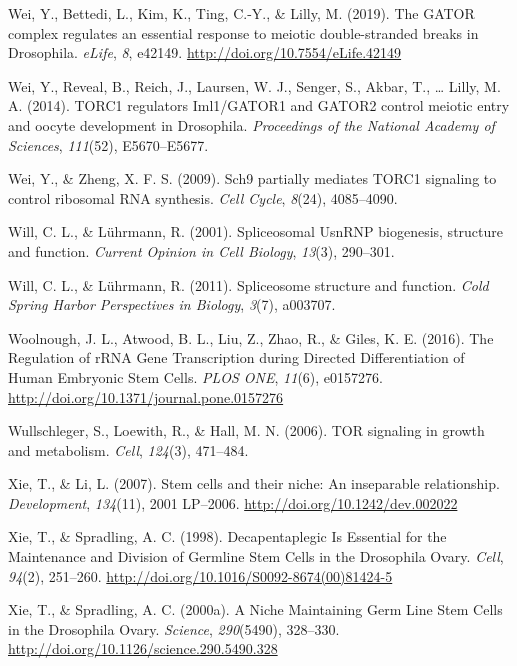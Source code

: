 \documentclass[12pt,twoside]{reedthesis}
\newlength{\cslhangindent}
\newenvironment{cslreferences}%
  {\setlength{\parindent}{0pt}%
  \everypar{\setlength{\hangindent}{\cslhangindent}}\ignorespaces}%
  {\par}
\begin{document}
\begin{cslreferences}
\leavevmode\hypertarget{ref-Wei2018a}{}%
Wei, Y., Bettedi, L., Kim, K., Ting, C.-Y., \& Lilly, M. (2019). The GATOR complex regulates an essential response to meiotic double-stranded breaks in Drosophila. \emph{eLife}, \emph{8}, e42149. \url{http://doi.org/10.7554/eLife.42149}

\leavevmode\hypertarget{ref-Wei2014b}{}%
Wei, Y., Reveal, B., Reich, J., Laursen, W. J., Senger, S., Akbar, T., \ldots{} Lilly, M. A. (2014). TORC1 regulators Iml1/GATOR1 and GATOR2 control meiotic entry and oocyte development in Drosophila. \emph{Proceedings of the National Academy of Sciences}, \emph{111}(52), E5670--E5677.

\leavevmode\hypertarget{ref-Wei2009a}{}%
Wei, Y., \& Zheng, X. F. S. (2009). Sch9 partially mediates TORC1 signaling to control ribosomal RNA synthesis. \emph{Cell Cycle}, \emph{8}(24), 4085--4090.

\leavevmode\hypertarget{ref-Will2001}{}%
Will, C. L., \& Lührmann, R. (2001). Spliceosomal UsnRNP biogenesis, structure and function. \emph{Current Opinion in Cell Biology}, \emph{13}(3), 290--301.

\leavevmode\hypertarget{ref-Will2011d}{}%
Will, C. L., \& Lührmann, R. (2011). Spliceosome structure and function. \emph{Cold Spring Harbor Perspectives in Biology}, \emph{3}(7), a003707.

\leavevmode\hypertarget{ref-woolnoughRegulationRRNAGene2016}{}%
Woolnough, J. L., Atwood, B. L., Liu, Z., Zhao, R., \& Giles, K. E. (2016). The Regulation of rRNA Gene Transcription during Directed Differentiation of Human Embryonic Stem Cells. \emph{PLOS ONE}, \emph{11}(6), e0157276. \url{http://doi.org/10.1371/journal.pone.0157276}

\leavevmode\hypertarget{ref-Wullschleger2006b}{}%
Wullschleger, S., Loewith, R., \& Hall, M. N. (2006). TOR signaling in growth and metabolism. \emph{Cell}, \emph{124}(3), 471--484.

\leavevmode\hypertarget{ref-Xie2007a}{}%
Xie, T., \& Li, L. (2007). Stem cells and their niche: An inseparable relationship. \emph{Development}, \emph{134}(11), 2001 LP--2006. \url{http://doi.org/10.1242/dev.002022}

\leavevmode\hypertarget{ref-Xie1998d}{}%
Xie, T., \& Spradling, A. C. (1998). Decapentaplegic Is Essential for the Maintenance and Division of Germline Stem Cells in the Drosophila Ovary. \emph{Cell}, \emph{94}(2), 251--260. \url{http://doi.org/10.1016/S0092-8674(00)81424-5}

\leavevmode\hypertarget{ref-Xie2000b}{}%
Xie, T., \& Spradling, A. C. (2000a). A Niche Maintaining Germ Line Stem Cells in the Drosophila Ovary. \emph{Science}, \emph{290}(5490), 328--330. \url{http://doi.org/10.1126/science.290.5490.328}


\end{cslreferences}
\end{document}
